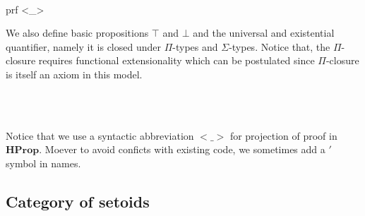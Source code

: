 \begin{code}\>\<%
\\
\>  \AgdaSymbol{:}  \<%
\\
\>[0]\<[2]%
\>[2] \<%
\\
\>[0]\<[2]%
\>[2]\<%
\\
\>[2]\<[4]%
\>[4] \AgdaSymbol{:} \<%
\\
\>[2]\<[4]%
\>[4] \AgdaSymbol{:} \AgdaSymbol{\{}  \AgdaSymbol{:} \AgdaSymbol{\}}    \<%
\\
\>    \AgdaSymbol{(}prf  <\_>\AgdaSymbol{)}\<%
\end{code}

We also define basic propositions $\top$ and $\bot$ and the universal and existential quantifier, namely it is closed under $\Pi$-types and $\Sigma$-types. Notice that, the $\Pi$-closure requires functional extensionality which can be postulated since $\Pi$-closure is itself an axiom in this model.

\begin{code}\>\<
%
\\
\> \AgdaSymbol{:} \AgdaSymbol{(} \AgdaSymbol{:} \AgdaSymbol{)(} \AgdaSymbol{:}   \AgdaSymbol{)}  \<%
\\
\>   \AgdaSymbol{=}  \AgdaSymbol{((} \AgdaSymbol{:} \AgdaSymbol{)}  \AgdaFunction{<}   \AgdaFunction{>}\AgdaSymbol{)} \AgdaSymbol{(}     \AgdaSymbol{(} \AgdaSymbol{)))}\<%
\>\<\end{code}

Notice that we use a syntactic abbreviation $<\_>$ for projection of proof in $\textbf{HProp}$. Moever to avoid conficts with existing code, we sometimes add a $'$ symbol in names. 


\subsection{Category of setoids}

